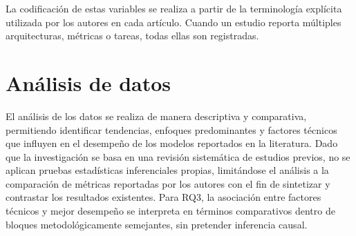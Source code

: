 La codificación de estas variables se realiza a partir de la terminología explícita utilizada por los autores en cada artículo. Cuando un estudio reporta múltiples arquitecturas, métricas o tareas, todas ellas son registradas. 

\section{Análisis de datos}

El análisis de los datos se realiza de manera descriptiva y comparativa, permitiendo identificar tendencias, enfoques predominantes y factores técnicos que influyen en el
desempeño de los modelos reportados en la literatura. Dado que la investigación se basa en una revisión sistemática de estudios previos, no se aplican pruebas estadísticas inferenciales propias, limitándose el análisis a la comparación de métricas reportadas por los autores con el fin de sintetizar y contrastar los resultados existentes. Para RQ3, la asociación entre factores técnicos y mejor desempeño se interpreta en términos comparativos dentro de bloques metodológicamente semejantes, sin pretender inferencia causal.

